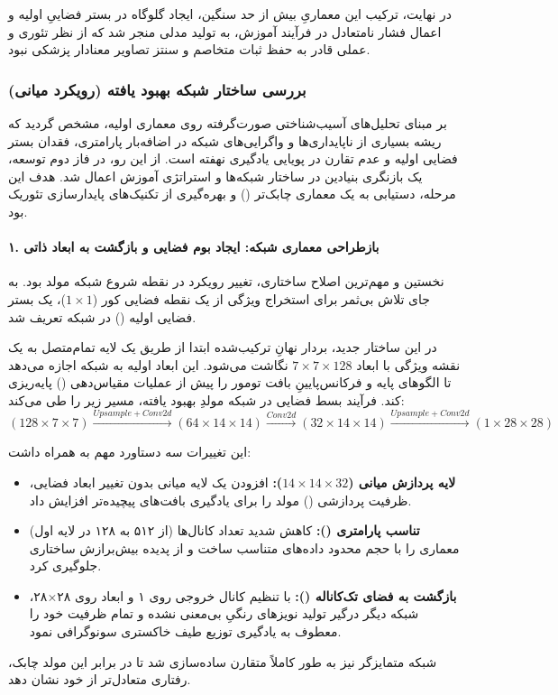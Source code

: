 \documentclass{article}
\begin{document}
در نهایت، ترکیب این معماریِ بیش از حد سنگین، ایجاد گلوگاه در بستر فضاییِ اولیه و اعمال فشار نامتعادل در فرآیند آموزش، به تولید مدلی منجر شد که از نظر تئوری و عملی قادر به حفظ ثبات متخاصم و سنتز تصاویر معنادار پزشکی نبود.


\newpage
\subsubsection{بررسی ساختار شبکه بهبود یافته (رویکرد میانی)}

بر مبنای تحلیل‌های آسیب‌شناختی صورت‌گرفته روی معماری اولیه، مشخص گردید که ریشه بسیاری از ناپایداری‌ها و واگرایی‌های شبکه در اضافه‌بار پارامتری، فقدان بستر فضایی اولیه و عدم تقارن در پویایی یادگیری نهفته است. از این رو، در فاز دوم توسعه، یک بازنگری بنیادین در ساختار شبکه‌ها و استراتژی آموزش اعمال شد. هدف این مرحله، دستیابی به یک معماری چابک‌تر () و بهره‌گیری از تکنیک‌های پایدارسازی تئوریک بود.

\paragraph{۱. بازطراحی معماری شبکه: ایجاد بوم فضایی و بازگشت به ابعاد ذاتی}
نخستین و مهم‌ترین اصلاح ساختاری، تغییر رویکرد در نقطه شروع شبکه مولد بود. به جای تلاش بی‌ثمر برای استخراج ویژگی از یک نقطه فضایی کور ($1 \times 1$)، یک بستر فضایی اولیه () در شبکه تعریف شد. 

در این ساختار جدید، بردار نهانِ ترکیب‌شده ابتدا از طریق یک لایه تمام‌متصل به یک نقشه ویژگی با ابعاد $7 \times 7 \times 128$ نگاشت می‌شود. این ابعاد اولیه به شبکه اجازه می‌دهد تا الگوهای پایه و فرکانس‌پایینِ بافت تومور را پیش از عملیات مقیاس‌دهی () پایه‌ریزی کند. فرآیند بسط فضایی در شبکه مولدِ بهبود یافته، مسیر زیر را طی می‌کند:
\begin{equation}
	(128 \times 7 \times 7) \xrightarrow{Upsample + Conv2d} (64 \times 14 \times 14) \xrightarrow{Conv2d} (32 \times 14 \times 14) \xrightarrow{Upsample + Conv2d} (1 \times 28 \times 28)
\end{equation}

این تغییرات سه دستاورد مهم به همراه داشت:
\begin{itemize}
	\item \textbf{لایه پردازش میانی ($14 \times 14 \times 32$):} افزودن یک لایه میانی بدون تغییر ابعاد فضایی، ظرفیت پردازشی () مولد را برای یادگیری بافت‌های پیچیده‌تر افزایش داد.
	\item \textbf{تناسب پارامتری ():} کاهش شدید تعداد کانال‌ها (از ۵۱۲ به ۱۲۸ در لایه اول) معماری را با حجم محدود داده‌های  متناسب ساخت و از پدیده بیش‌برازش ساختاری جلوگیری کرد.
	\item \textbf{بازگشت به فضای تک‌کاناله ():} با تنظیم کانال خروجی روی ۱ و ابعاد روی ۲۸×۲۸، شبکه دیگر درگیر تولید نویزهای رنگیِ بی‌معنی نشده و تمام ظرفیت خود را معطوف به یادگیری توزیع طیف خاکستری سونوگرافی نمود.
\end{itemize}
شبکه متمایزگر نیز به طور کاملاً متقارن ساده‌سازی شد تا در برابر این مولد چابک، رفتاری متعادل‌تر از خود نشان دهد.
\end{document}
